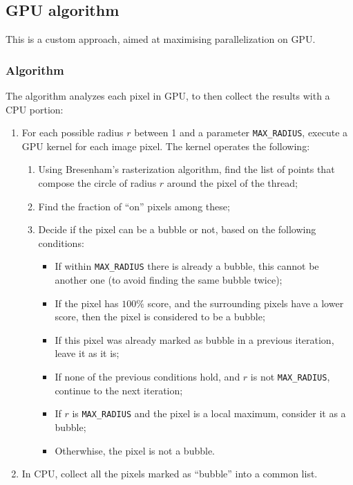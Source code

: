 \subsection{GPU algorithm}

This is a custom approach, aimed at maximising parallelization on GPU.

\subsubsection{Algorithm}

The algorithm analyzes each pixel in GPU, to then collect the results with a CPU portion:
\begin{enumerate}
	\itemsep 0em
	\item For each possible radius $r$ between 1 and a parameter \texttt{MAX\_RADIUS}, execute a GPU kernel for each image pixel. The kernel operates the following:
	      \begin{enumerate}
		      \item Using Bresenham's rasterization algorithm, find the list of points that compose the circle of radius $r$ around the pixel of the thread;
		      \item Find the fraction of ``on'' pixels among these;
		      \item Decide if the pixel can be a bubble or not, based on the following conditions:
		            \begin{itemize}
			            \item If within \texttt{MAX\_RADIUS} there is already a bubble, this cannot be another one (to avoid finding the same bubble twice);
			            \item If the pixel has $100\%$ score, and the surrounding pixels have a lower score, then the pixel is considered to be a bubble;
			            \item If this pixel was already marked as bubble in a previous iteration, leave it as it is;
			            \item If none of the previous conditions hold, and $r$ is not \texttt{MAX\_RADIUS}, continue to the next iteration;
			            \item If $r$ is \texttt{MAX\_RADIUS} and the pixel is a local maximum, consider it as a bubble;
			            \item Otherwhise, the pixel is not a bubble.
		            \end{itemize}
	      \end{enumerate}
	\item In CPU, collect all the pixels marked as ``bubble'' into a common list.
\end{enumerate}

